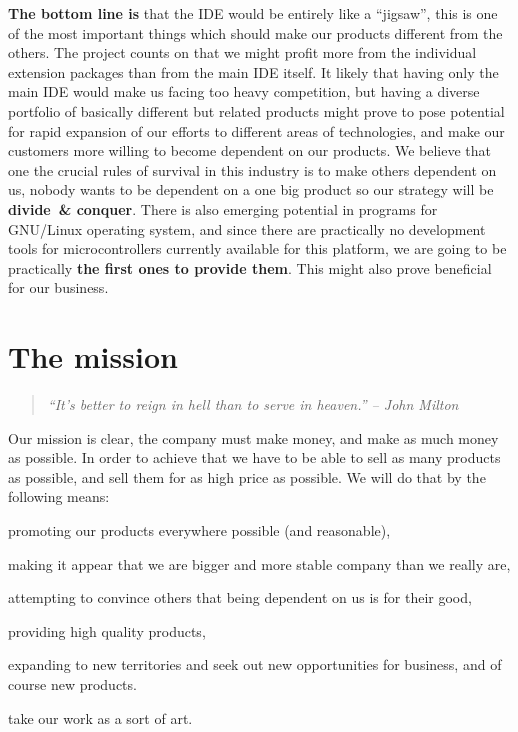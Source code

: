 \documentclass[a4paper,twoside,15pt]{book}
\begin{document}
		\textbf{The bottom line is} that the IDE would be entirely like a ``jigsaw'', this is one of the most important things which should make our products different from the others. The project counts on that we might profit more from the individual extension packages than from the main IDE itself. It likely that having only the main IDE would make us facing too heavy competition, but having a diverse portfolio of basically different but related products might prove to pose potential for rapid expansion of our efforts to different areas of technologies, and make our customers more willing to become dependent on our products. We believe that one the crucial rules of survival in this industry is to make others dependent on us, nobody wants to be dependent on a one big product so our strategy will be \textbf{divide~\& conquer}. There is also emerging potential in programs for GNU/Linux operating system, and since there are practically no development tools for microcontrollers currently available for this platform, 
we are going to be practically \textbf{the first ones to provide them}. This might also prove beneficial for our business.

	\section{The mission}
		\begin{quote}
			\textit{``It's better to reign in hell than to serve in heaven.'' -- John Milton}
		\end{quote}

		Our mission is clear, the company must make money, and make as much money as possible. In order to achieve that we have to be able to sell as many products as possible, and sell them for as high price as possible. We will do that by the following means:
		\begin{dinglist}{73}
			\item promoting our products everywhere possible (and reasonable),
			\item making it appear that we are bigger and more stable company than we really are,
			\item attempting to convince others that being dependent on us is for their good,
			\item providing high quality products,
			\item expanding to new territories and seek out new opportunities for business, and of course new products.
			\item take our work as a sort of art.
		\end{dinglist}
\end{document}
